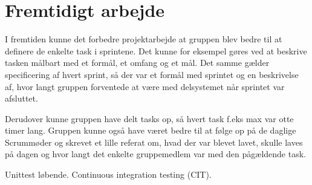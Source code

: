 \section{Fremtidigt arbejde}
I fremtiden kunne det forbedre projektarbejde at gruppen blev bedre til at definere de enkelte task i sprintene. Det kunne for eksempel gøres ved at beskrive tasken målbart med et formål, et omfang og et mål. Det samme gælder specificering af hvert sprint, så der var et formål med sprintet og en beskrivelse af, hvor langt gruppen forventede at være med delsystemet når sprintet var afsluttet.

Derudover kunne gruppen have delt tasks op, så hvert task f.eks max var otte timer lang. Gruppen kunne også have været bedre til at følge op på de daglige Scrummøder og skrevet et lille referat om, hvad der var blevet lavet, skulle laves på dagen og hvor langt det enkelte gruppemedlem var med den pågældende task.

Unittest løbende. Continuous integration testing (CIT). 